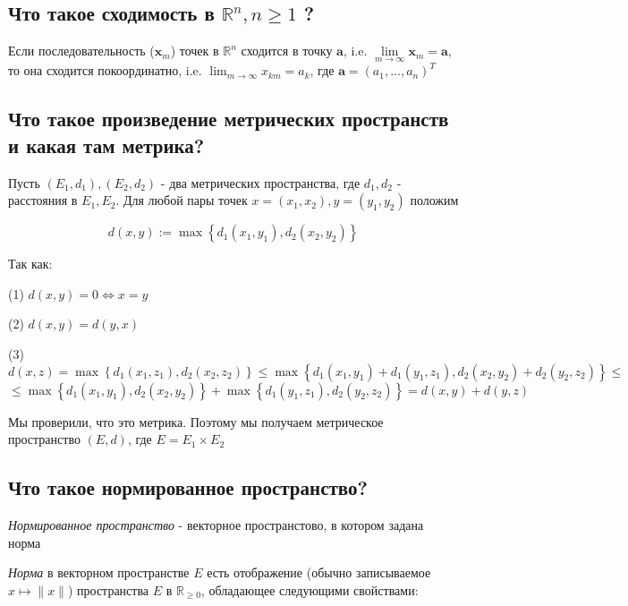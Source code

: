 \documentclass[a4paper]{article}
\begin{document}
\subsection{Что такое сходимость в $\mathbb{R}^{n}, n \geqslant 1$ ?}


Если последовательность ($\mathbf{x}_{m}$) точек в $\mathbb{R}^{n}$ сходится в точку $\mathbf{a}$, i.e. $\lim\limits_{m \rightarrow \infty} \mathbf{x}_{m}=\mathbf{a}$, то она сходится покоординатно, i.e. $\lim_{m \rightarrow \infty} x_{k m}=a_{k}$, где $\mathbf{a}=\left(a_{1}, \ldots, a_{n}\right)^{T}$

\subsection{Что такое произведение метрических пространств и какая там метрика?}


Пусть $\left(E_{1}, d_{1}\right),\left(E_{2}, d_{2}\right)$ - два метрических пространства, где $d_{1}, d_{2}$ - расстояния в $E_{1}, E_{2}$. Для любой пары точек $x=\left(x_{1}, x_{2}\right), y=\left(y_{1}, y_{2}\right)$ положим

$$
d(x, y):=\max \left\{d_{1}\left(x_{1}, y_{1}\right), d_{2}\left(x_{2}, y_{2}\right)\right\}
$$

Так как:

(1) $d(x, y)=0 \Longleftrightarrow x=y$

(2) $d(x, y)=d(y, x)$

(3) $d(x, z)=\max \left\{d_{1}\left(x_{1}, z_{1}\right), d_{2}\left(x_{2}, z_{2}\right)\right\} \leqslant \max \left\{d_{1}\left(x_{1}, y_{1}\right)+d_{1}\left(y_{1}, z_{1}\right), d_{2}\left(x_{2}, y_{2}\right)+d_{2}\left(y_{2}, z_{2}\right)\right\} \leqslant$ $\leqslant \max \left\{d_{1}\left(x_{1}, y_{1}\right), d_{2}\left(x_{2}, y_{2}\right)\right\}+\max \left\{d_{1}\left(y_{1}, z_{1}\right), d_{2}\left(y_{2}, z_{2}\right)\right\}=d(x, y)+d(y, z)$

Мы проверили, что это метрика. Поэтому мы получаем метрическое пространство $(E, d)$, где $E=E_{1} \times E_{2}$
\newpage
\subsection{Что такое нормированное пространство?}


\textit{Нормированное пространство} - векторное пространстово, в котором задана норма

\textit{Норма} в векторном пространстве $E$ есть отображение (обычно записываемое $x \mapsto\|x\|$) пространства $E$ в $\mathbb{R}_{\geqslant 0}$, обладающее следующими свойствами:
\end{document}
